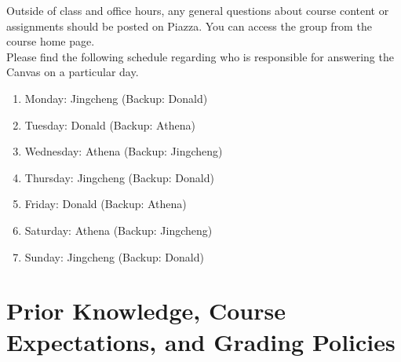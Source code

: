 \documentclass[11pt]{article}
\begin{document}
Outside of class and office hours, any general questions about course content or assignments should be posted on Piazza. You can access the group from the course home page.  \\

Please find the following schedule regarding who is responsible for answering the Canvas on a particular day.

\begin{enumerate}
\item Monday: Jingcheng (Backup: Donald)
\item Tuesday: Donald (Backup: Athena)
\item Wednesday: Athena (Backup: Jingcheng)
\item Thursday: Jingcheng (Backup: Donald)
\item Friday: Donald (Backup: Athena)
\item Saturday: Athena (Backup: Jingcheng)
\item Sunday: Jingcheng (Backup: Donald)
\end{enumerate}





\section{Prior Knowledge, Course Expectations, and Grading Policies}
\end{document}
